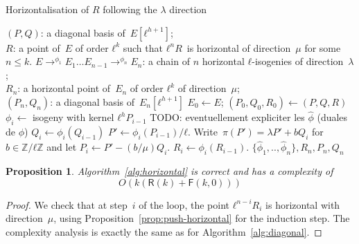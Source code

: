 \documentclass{lms}
\newcommand{\todo}[1]{{\color{red}TODO: #1}}
\newtheorem{prop}[thm]{Proposition}
\def\pa#1{\left(#1\right)}
\def\cout#1{\mathsf{#1}}
\begin{document}
\begin{algorithm}
\caption{\label{alg:horizontal}Horizontalisation of $R$ following the $\lambda$ direction}
\begin{algorithmic}[1]
\REQUIRE $(P, Q)$: a diagonal basis of~$E[ℓ^{h+1}]$;\\
$R$: a point of~$E$ of order $ℓ^k$ such that
$ℓ^n R$~is horizontal of direction~$μ$ for some~$n ≤ k$.
\ENSURE $E →^{ϕ_1} E_{1} … E_{n-1} →^{ϕ_n} E_n$:
a chain of $n$ horizontal $ℓ$-isogenies of direction~$λ$;\\
$R_n$: a horizontal point of~$E_{n}$ of order $ℓ^k$ of direction~$μ$;\\
$(P_n,Q_n)$: a diagonal basis  of~$E_n[ℓ^{h+1}]$
\STATE $E_0 \gets E$; $(P_0, Q_0, R_0) \gets (P, Q, R)$
\STATE $ϕ_i\gets $ isogeny with kernel ${ℓ^h P_{i-1}}$ \todo{eventuellement expliciter les $\widehat{ϕ}$ (duales de $\phi$) }
\STATE $Q_{i} \gets ϕ_i(Q_{i-1})$
\STATE $P' \gets ϕ_i(P_{i-1})/ℓ$.
\STATE Write~$π(P') = λ P' + b Q_i$ for~$b ∈ ℤ/ℓℤ$ and
let $P_{i} \gets P' - (b/μ) Q_i$.
\STATE $R_i \gets ϕ_i(R_{i-1})$.
\ENDFOR
\RETURN $\{\widehat{ϕ}_1,..,\widehat{ϕ}_n\}, R_n, P_n, Q_n $
\end{algorithmic}
\end{algorithm}
\begin{prop}
Algorithm~\ref{alg:horizontal} is correct and has a complexity of
\begin{equation*}
O(k(\mathsf{R}(k)+\mathsf{F}(k,0)))
\end{equation*}
\end{prop}
%  
\begin{proof}
We check that at step~$i$ of the loop,
the point $ℓ^{n-i} R_i$ is horizontal with direction~$μ$,
using Proposition~\ref{prop:push-horizontal} for the induction step.
The complexity analysis %
is exactly the same as for Algorithm~\ref{alg:diagonal}.
\end{proof}
\end{document}
